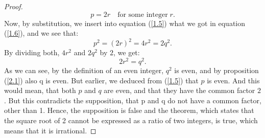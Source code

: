 \documentclass[11pt]{amsart}
\theoremstyle{definition}
\begin{document}
\begin{proof}
    \begin{equation}\label{1.6}
        p = 2r \quad \text{for some integer} \; r.
    \end{equation}
    Now, by substitution, we insert into equation (\ref{1.5}) what we got in equation (\ref{1.6}), and we see that:
    \begin{equation}\label{1.7}
        p^{2} = (2r)^{2} = 4r^{2} = 2q^{2}.
    \end{equation}
    By dividing both, \(4r^{2}\) and \(2q^{2}\) by \(2\), we get:
    \begin{equation}\label{1.8}
        2r^{2} = q^{2}.
    \end{equation}
    As we can see, by the definition of an even integer, \(q^{2}\) is even, and by proposition (\ref{2.1}) also q is even. But earlier, we deduced from (\ref{1.5}) that \(p\) is even. And this would mean, that both \(p\) and \(q\) are even, and that they have the common factor \(2\). But this contradicts the supposition, that p and q do not have a common factor, other than 1. Hence, the supposition is false and the theorem, which states that the square root of 2 cannot be expressed as a ratio of two integers, is true, which means that it is irrational.
\end{proof}






\printbibliography
\end{document}
